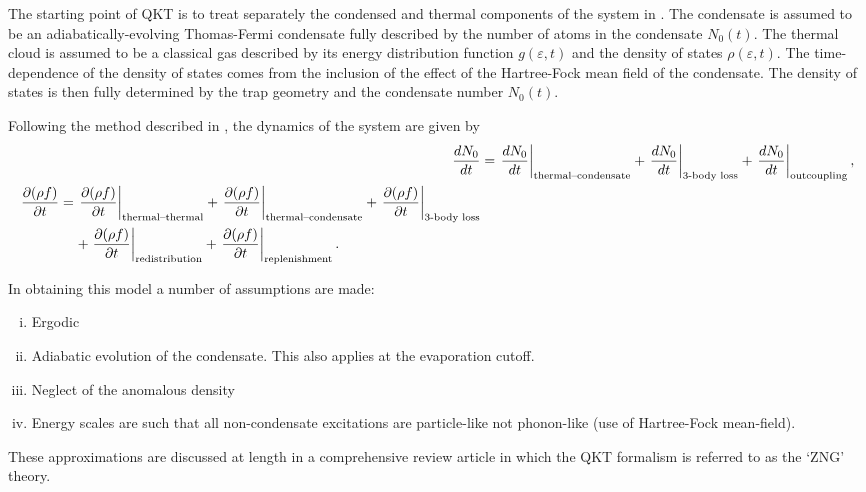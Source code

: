 The starting point of QKT is to treat separately the condensed and thermal components of the system in . The condensate is assumed to be an adiabatically-evolving Thomas-Fermi condensate fully described by the number of atoms in the condensate $N_0(t)$. The thermal cloud is assumed to be a classical gas described by its energy distribution function $g(\varepsilon, t)$ and the density of states $\rho(\varepsilon, t)$. The time-dependence of the density of states comes from the inclusion of the effect of the Hartree-Fock mean field of the condensate. The density of states is then fully determined by the trap geometry and the condensate number $N_0(t)$.

Following the method described in \citet{Bijlsma:2000}, the dynamics of the system are given by
\begin{subequations}
    \begin{align}
        \frac{d N_0}{d t} &= \left.\frac{d N_0}{d t}\right|_\text{thermal--condensate} + \left.\frac{d N_0}{d t}\right|_\text{3-body loss} + \left.\frac{d N_0}{d t}\right|_\text{outcoupling},\\
        \begin{split}
            \frac{\partial (\rho f)}{\partial t} &= \left.\frac{\partial (\rho f)}{\partial t}\right|_\text{thermal--thermal} + \left. \frac{\partial (\rho f)}{\partial t}\right|_\text{thermal--condensate} + \left.\frac{\partial (\rho f)}{\partial t}\right|_\text{3-body loss}\\
            &\relphantom{=} + \left. \frac{\partial (\rho f)}{\partial t}\right|_\text{redistribution} + \left. \frac{\partial (\rho f)}{\partial t}\right|_\text{replenishment}.
        \end{split}
    \end{align}
\end{subequations}






In obtaining this model a number of assumptions are made:
\begin{enumerate}[(i)]
    \item Ergodic
    \item Adiabatic evolution of the condensate. This also applies at the evaporation cutoff.
    \item Neglect of the anomalous density
    \item Energy scales are such that all non-condensate excitations are particle-like not phonon-like (use of Hartree-Fock mean-field).
\end{enumerate}
These approximations are discussed at length in a comprehensive review article \citep{Proukakis:2008} in which the QKT formalism is referred to as the `ZNG' theory.


